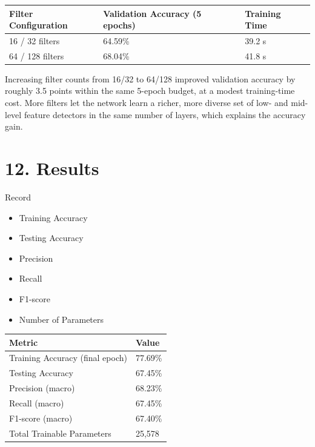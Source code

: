 \documentclass[11pt]{article}
\begin{document}
\begin{enumerate}
\begin{center}
\begin{tabular}{|l|l|l|}
\hline
\textbf{Filter Configuration} & \textbf{Validation Accuracy (5 epochs)} & \textbf{Training Time}\\
\hline
16 / 32 filters & 64.59\% & 39.2 s\\
\hline
64 / 128 filters & 68.04\% & 41.8 s\\
\hline
\end{tabular}
\end{center}

Increasing filter counts from 16/32 to 64/128 improved validation accuracy by roughly 3.5 points within the same 5-epoch budget, at a modest training-time cost. More filters let the network learn a richer, more diverse set of low- and mid-level feature detectors in the same number of layers, which explains the accuracy gain.

\end{enumerate}

\section*{12. Results}

Record

\begin{itemize}
\item Training Accuracy
\item Testing Accuracy
\item Precision
\item Recall
\item F1-score
\item Number of Parameters
\end{itemize}

\begin{center}
\begin{tabular}{|l|l|}
\hline
\textbf{Metric} & \textbf{Value}\\
\hline
Training Accuracy (final epoch) & 77.69\%\\
\hline
Testing Accuracy & 67.45\%\\
\hline
Precision (macro) & 68.23\%\\
\hline
Recall (macro) & 67.45\%\\
\hline
F1-score (macro) & 67.40\%\\
\hline
Total Trainable Parameters & 25,578\\
\hline
\end{tabular}
\end{center}
\end{document}
